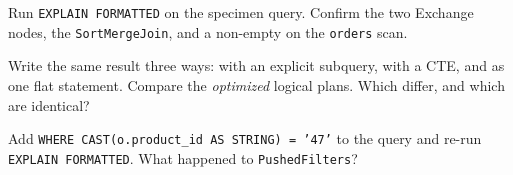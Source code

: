 \exercisehead
\begin{exercises}
\item Run \texttt{EXPLAIN FORMATTED} on the specimen query. Confirm the two
      Exchange nodes, the \texttt{SortMergeJoin}, and a non-empty
       on the \texttt{orders} scan.
\item Write the same result three ways: with an explicit subquery, with a CTE,
      and as one flat statement. Compare the \emph{optimized} logical plans.
      Which differ, and which are identical?
\item Add \texttt{WHERE CAST(o.product\_id AS STRING) = '47'} to the query and
      re-run \texttt{EXPLAIN FORMATTED}. What happened to \texttt{PushedFilters}?
\end{exercises}

